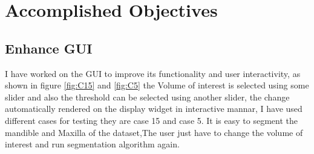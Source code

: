 \documentclass[11pt, b5paper]{article}
\begin{document}
\section{Accomplished Objectives}
\subsection{Enhance GUI}
I have worked on the GUI to improve its functionality and user interactivity, as shown in figure \ref{fig:C15} and \ref{fig:C5} the Volume of interest is selected using some slider and also the threshold can be selected using another slider, the change automatically rendered on the display widget in interactive mannar, I have used different cases for testing they are case 15 and case 5. It is easy to segment the mandible and Maxilla of the dataset,The user just have to change the volume of interest and run segmentation algorithm again.
\end{document}
